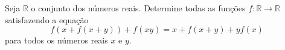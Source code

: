 Seja $\mathbb R$ o conjunto dos números reais. Determine todas as funções $f:\mathbb R\to\mathbb R$ satisfazendo a equação \[f(x+f(x+y))+f(xy)=x+f(x+y)+yf(x)\] para todos os números reais $x$ e $y$.
